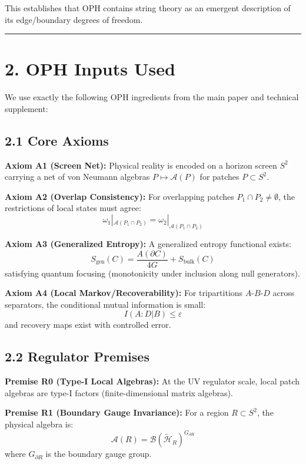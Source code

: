 This establishes that OPH contains string theory as an emergent description of its edge/boundary degrees of freedom.

\begin{center}\rule{0.5\linewidth}{0.5pt}\end{center}

\section{2. OPH Inputs Used}\label{2-oph-inputs-used}

We use exactly the following OPH ingredients from the main paper and technical supplement:

\subsection{2.1 Core Axioms}\label{21-core-axioms}

\textbf{Axiom A1 (Screen Net):} Physical reality is encoded on a horizon screen \(S^2\) carrying a net of von Neumann algebras \(P \mapsto \mathcal{A}(P)\) for patches \(P \subset S^2\).

\textbf{Axiom A2 (Overlap Consistency):} For overlapping patches \(P_1 \cap P_2 \neq \emptyset\), the restrictions of local states must agree: \[\omega_1|_{\mathcal{A}(P_1 \cap P_2)} = \omega_2|_{\mathcal{A}(P_1 \cap P_2)}\]

\textbf{Axiom A3 (Generalized Entropy):} A generalized entropy functional exists: \[S_{\text{gen}}(C) = \frac{A(\partial C)}{4G} + S_{\text{bulk}}(C)\] satisfying quantum focusing (monotonicity under inclusion along null generators).

\textbf{Axiom A4 (Local Markov/Recoverability):} For tripartitions \(A\)-\(B\)-\(D\) across separators, the conditional mutual information is small: \[I(A:D|B) \leq \varepsilon\] and recovery maps exist with controlled error.

\subsection{2.2 Regulator Premises}\label{22-regulator-premises}

\textbf{Premise R0 (Type-I Local Algebras):} At the UV regulator scale, local patch algebras are type-I factors (finite-dimensional matrix algebras).

\textbf{Premise R1 (Boundary Gauge Invariance):} For a region \(R \subset S^2\), the physical algebra is: \[\mathcal{A}(R) = \mathcal{B}(\tilde{\mathcal{H}}_R)^{G_{\partial R}}\] where \(G_{\partial R}\) is the boundary gauge group.

